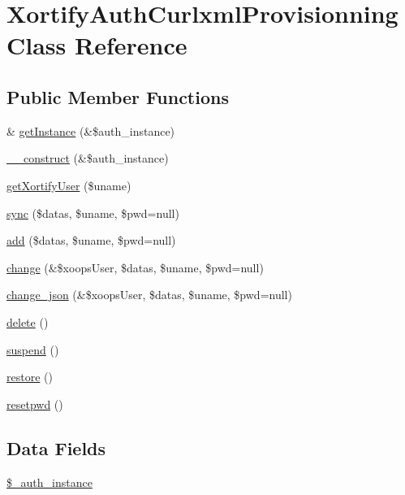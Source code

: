 \hypertarget{class_xortify_auth_curlxml_provisionning}{\section{Xortify\-Auth\-Curlxml\-Provisionning Class Reference}
\label{class_xortify_auth_curlxml_provisionning}
}
\subsection*{Public Member Functions}
\begin{DoxyCompactItemize}
\item 
\& \hyperlink{class_xortify_auth_curlxml_provisionning_a2c8eaa915c70d75289ac8a03686194f9}{get\-Instance} (\&\$auth\-\_\-instance)
\item 
\hyperlink{class_xortify_auth_curlxml_provisionning_a0f25832dc86774e7605b81fe57b083c2}{\-\_\-\-\_\-construct} (\&\$auth\-\_\-instance)
\item 
\hyperlink{class_xortify_auth_curlxml_provisionning_a041d726ac26672547ed1504e8e0117aa}{get\-Xortify\-User} (\$uname)
\item 
\hyperlink{class_xortify_auth_curlxml_provisionning_a35dc08b0f2138eb818ff95345b73bcff}{sync} (\$datas, \$uname, \$pwd=null)
\item 
\hyperlink{class_xortify_auth_curlxml_provisionning_adfc9fcef01e7bd7b2f47e8e79d51fc63}{add} (\$datas, \$uname, \$pwd=null)
\item 
\hyperlink{class_xortify_auth_curlxml_provisionning_ae1f0971b9712c794620cf309164e43af}{change} (\&\$xoops\-User, \$datas, \$uname, \$pwd=null)
\item 
\hyperlink{class_xortify_auth_curlxml_provisionning_a94f4e0408f26e65abca347ec883f4ec9}{change\-\_\-json} (\&\$xoops\-User, \$datas, \$uname, \$pwd=null)
\item 
\hyperlink{class_xortify_auth_curlxml_provisionning_a13bdffdd926f26b825ea57066334ff01}{delete} ()
\item 
\hyperlink{class_xortify_auth_curlxml_provisionning_ad73006a505121228f3b075c2409787d2}{suspend} ()
\item 
\hyperlink{class_xortify_auth_curlxml_provisionning_aa1371f22826cf8cde4454c9b467203d0}{restore} ()
\item 
\hyperlink{class_xortify_auth_curlxml_provisionning_a06d70fbd3a2db390b6f2530c0076628e}{resetpwd} ()
\end{DoxyCompactItemize}
\subsection*{Data Fields}
\begin{DoxyCompactItemize}
\item 
\hyperlink{class_xortify_auth_curlxml_provisionning_a486ed878bb5a7188c99ac4c9ee46ac6e}{\$\-\_\-auth\-\_\-instance}
\end{DoxyCompactItemize}


